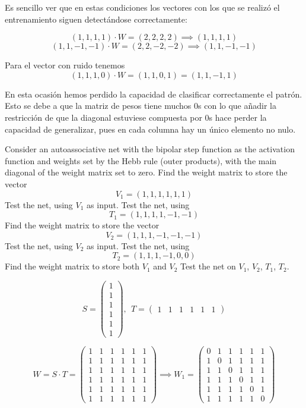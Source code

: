\begin{problem}[8]
Es sencillo ver que en estas condiciones los vectores con los que se realizó el entrenamiento siguen detectándose correctamente:

\[(1,1,1,1)\cdot W = (2,2,2,2) \implies (1,1,1,1)\]
\[(1,1,-1,-1) \cdot W = (2,2,-2,-2) \implies (1,1,-1,-1)\]

Para el vector con ruido tenemos
\[(1,1,1,0) \cdot W = (1,1,0,1) = (1,1,-1,1)\]

En esta ocasión hemos perdido la capacidad de clasificar correctamente el patrón. Esto se debe a que la matriz de pesos tiene muchos 0s con lo que añadir la restricción de que la diagonal estuviese compuesta por 0s hace perder la capacidad de generalizar, pues en cada columna hay un único elemento no nulo.
\end{problem}

\begin{problem}[9]
Consider an autoassociative net with the bipolar step function as the activation function and weights set by the Hebb rule (outer products), with the main diagonal of the weight matrix set to zero.
\ppart Find the weight matrix to store the vector
\[V_1 = (1, 1, 1, 1,1, 1)\]
\ppart Test the net, using $V_1$ as input.
\ppart Test the net, using
\[T_1 = (1, 1, 1, 1, -1, -1)\]
\ppart Find the weight matrix to store the vector
\[V_2 = (1,1, 1, -1, -1, -1)\]
\ppart Test the net, using $V_2$ as input.
\ppart Test the net, using
\[T_2 = (1, 1, 1, -1,0,0)\]
\ppart Find the weight matrix to store both $V_1$ and $V_2$
\ppart Test the net on $V_1$, $V_2$, $T_1$, $T_2$.

\solution
{}

\spart

\[S = \left( \begin{array}{c}
1 \\
1 \\
1 \\
1 \\
1 \\
1
\end{array}\right), \ \ T = \left( \begin{array}{cccccc}
1 & 1 & 1 & 1 & 1 & 1
\end{array}\right)\]

\[W = S\cdot T = \left( \begin{array}{cccccc}
1 & 1 & 1 & 1 & 1 & 1 \\
1 & 1 & 1 & 1 & 1 & 1 \\
1 & 1 & 1 & 1 & 1 & 1 \\
1 & 1 & 1 & 1 & 1 & 1 \\
1 & 1 & 1 & 1 & 1 & 1 \\
1 & 1 & 1 & 1 & 1 & 1
\end{array}\right) \implies W_1 = \left( \begin{array}{cccccc}
0 & 1 & 1 & 1 & 1 & 1 \\
1 & 0 & 1 & 1 & 1 & 1 \\
1 & 1 & 0 & 1 & 1 & 1 \\
1 & 1 & 1 & 0 & 1 & 1 \\
1 & 1 & 1 & 1 & 0 & 1 \\
1 & 1 & 1 & 1 & 1 & 0
\end{array}\right) \]


\end{problem}

